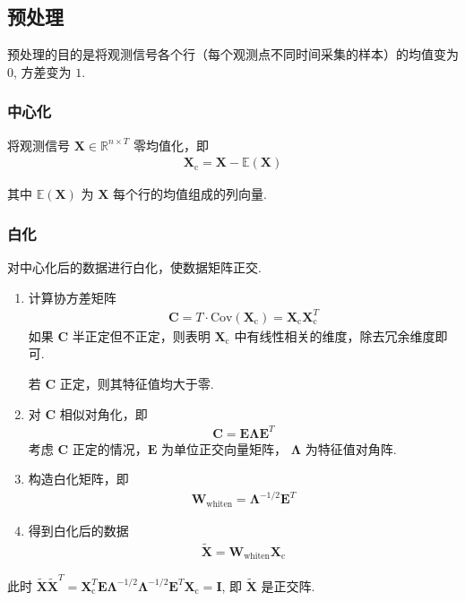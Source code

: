 \documentclass{article}
\newcommand{\bs}[1]{\boldsymbol{#1}}
\newcommand{\RR}{\mathbb{R}}
\newcommand{\EE}{\mathbb{E}}
\newcommand{\XC}{\bs{X}_\mathrm{c}}
\newcommand{\np}{\indent\par}
\begin{document}
\subsection{预处理}

预处理的目的是将观测信号各个行（每个观测点不同时间采集的样本）的均值变为 $0$, 方差变为 $1$.

\subsubsection*{中心化}

将观测信号 $\bs{X} \in \RR^{n \times T}$ 零均值化，即
\begin{align*}
    \bs{X}_\mathrm{c} = \bs{X} - \EE (\bs{X})
\end{align*} 
\par 其中 $\EE (\bs{X})$ 为 $\bs{X}$ 每个行的均值组成的列向量.

\subsubsection*{白化}

对中心化后的数据进行白化，使数据矩阵正交. \np
\begin{enumerate}
    \item 计算协方差矩阵
    \begin{align*}
        \bs{C} = T\cdot\mathrm{Cov}(\XC) = \XC\XC^T
    \end{align*}
    如果 $\bs{C}$ 半正定但不正定，则表明 $\XC$ 中有线性相关的维度，除去冗余维度即可. \np
    若 $\bs{C}$ 正定，则其特征值均大于零.
    \item 对 $\bs{C}$ 相似对角化，即
    \begin{align*}
        \bs{C} = \bs{E}\bs{\Lambda}\bs{E}^T
    \end{align*}
    考虑 $\bs{C}$ 正定的情况，$\bs{E}$ 为单位正交向量矩阵， $\bs{\Lambda}$ 为特征值对角阵.
    \item 构造白化矩阵，即
    \begin{align*}
        \bs{W}_\mathrm{whiten} = \bs{\Lambda}^{-1/2}\bs{E}^T
    \end{align*}
    \item 得到白化后的数据
    \begin{align*}
        \tilde{\bs{X}} = \bs{W}_\mathrm{whiten}\XC
    \end{align*}
\end{enumerate}
\par 此时 $\tilde{\bs{X}}\tilde{\bs{X}}^T = \XC^T\bs{E}\bs{\Lambda}^{-1/2}\bs{\Lambda}^{-1/2}\bs{E}^T\XC = \bs{I}$, 即 $\tilde{\bs{X}}$ 是正交阵.
\end{document}
